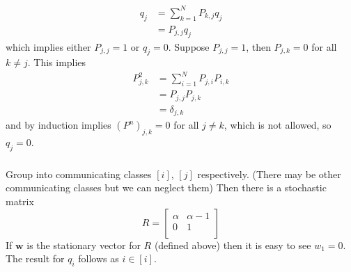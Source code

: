 \documentclass{unswmaths}
\begin{document}
\subsection{}
\subsubsection{}
    \begin{align*}
        q_j &= \sum_{k=1}^{N} P_{k,j}q_j \\
            &= P_{j,j} q_j
    \end{align*}
    which implies either $ P_{j,j} = 1 $ or $ q_j = 0 $. Suppose $ P_{j,j} = 1 $, then $ P_{j,k} = 0 $ for all $ k \neq j $. This implies
    \begin{align*}
        P_{j,k}^2 &= \sum_{i = 1}^N P_{j,i}P_{i,k} \\
            &= P_{j,j}P_{j,k} \\
            &= \delta_{j,k}
    \end{align*}
    and by induction implies 
     $ (P^n)_{j,k} = 0 $ for all $ j \neq k $, which is not allowed, so $ q_j = 0 $.
\subsubsection{}
  Group into communicating classes $ [i] $, $ [j] $ respectively. (There may be other communicating classes but we can neglect them) Then there is a stochastic matrix
  $$
    R = \left[ 
    \begin{array}{cc}
      \alpha & \alpha-1 \\
      0 & 1 \\
    \end{array}
    \right]
  $$
  If $ \mathbf{w} $ is the stationary vector for $ R $ (defined above) then it is easy to see $ w_1 = 0 $.
  The result for $ q_i $ follows as $ i \in [i] $. 
\end{document}
